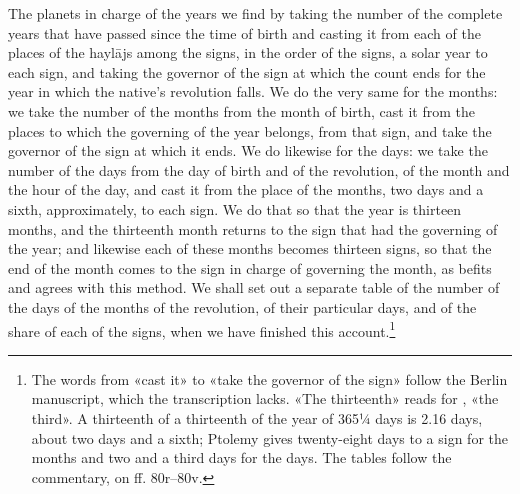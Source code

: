 \documentclass[11pt]{article}
\begin{document}
\par The planets in charge of the years we find by taking the number of the complete years that have passed since the time of birth and casting it from each of the places of the haylājs among the signs, in the order of the signs, a solar year to each sign, and taking the governor of the sign at which the count ends for the year in which the native's revolution falls. We do the very same for the months: we take the number of the months from the month of birth, cast it from the places to which the governing of the year belongs, from that sign, and take the governor of the sign at which it ends. We do likewise for the days: we take the number of the days from the day of birth and of the revolution, of the month and the hour of the day, and cast it from the place of the months, two days and a sixth, approximately, to each sign. We do that so that the year is thirteen months, and the thirteenth month returns to the sign that had the governing of the year; and likewise each of these months becomes thirteen signs, so that the end of the month comes to the sign in charge of governing the month, as befits and agrees with this method. We shall set out a separate table of the number of the days of the months of the revolution, of their particular days, and of the share of each of the signs, when we have finished this account.\footnote{The words from «cast it» to «take the governor of the sign» follow the Berlin manuscript, which the transcription lacks. «The thirteenth» reads  for , «the third». A thirteenth of a thirteenth of the year of 365¼ days is 2.16 days, about two days and a sixth; Ptolemy gives twenty-eight days to a sign for the months and two and a third days for the days. The tables follow the commentary, on ff. 80r–80v.}\par
\end{document}
